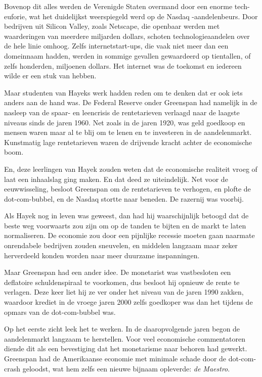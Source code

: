 \documentclass[
  a5paper,
  smalldemyvopaper,11pt,twoside,onecolumn,openright,extrafontsizes,
hidelinks]{memoir}
\begin{document}
Bovenop dit alles werden de Verenigde Staten overmand door een enorme
tech-euforie, wat het duidelijkst weerspiegeld werd op de Nasdaq
-aandelenbeurs. Door bedrijven uit Silicon Valley, zoals Netscape, die
openbaar werden met waarderingen van meerdere miljarden dollars, schoten
technologieaandelen over de hele linie omhoog. Zelfs internetstart-ups,
die vaak niet meer dan een domeinnaam hadden, werden in sommige gevallen
gewaardeerd op tientallen, of zelfs honderden, miljoenen dollars. Het
internet was de toekomst en iedereen wilde er een stuk van hebben.

Maar studenten van Hayeks werk hadden reden om te denken dat er ook iets
anders aan de hand was. De Federal Reserve onder Greenspan had namelijk
in de nasleep van de spaar- en leencrisis de rentetarieven verlaagd naar
de laagste niveaus sinds de jaren 1960. Net zoals in de jaren 1920, was
geld goedkoop en mensen waren maar al te blij om te lenen en te
investeren in de aandelenmarkt. Kunstmatig lage rentetarieven waren de
drijvende kracht achter de economische boom.

En, deze leerlingen van Hayek zouden weten dat de economische realiteit
vroeg of laat een inhaalslag ging maken. En dat deed ze uiteindelijk.
Net voor de eeuwwisseling, besloot Greenspan om de rentetarieven te
verhogen, en plofte de dot-com-bubbel, en de Nasdaq stortte naar
beneden. De razernij was voorbij.

Als Hayek nog in leven was geweest, dan had hij waarschijnlijk betoogd
dat de beste weg voorwaarts zou zijn om op de tanden te bijten en de
markt te laten normaliseren. De economie zou door een pijnlijke recessie
moeten gaan naarmate onrendabele bedrijven zouden sneuvelen, en middelen
langzaam maar zeker herverdeeld konden worden naar meer duurzame
inspanningen.

Maar Greenspan had een ander idee. De monetarist was vastbesloten een
deflatoire schuldenspiraal te voorkomen, dus besloot hij opnieuw de
rente te verlagen. Deze keer liet hij ze ver onder het niveau van de
jaren 1990 zakken, waardoor krediet in de vroege jaren 2000 zelfs
goedkoper was dan het tijdens de opmars van de dot-com-bubbel was.

Op het eerste zicht leek het te werken. In de daaropvolgende jaren begon
de aandelenmarkt langzaam te herstellen. Voor veel economische
commentatoren diende dit als een bevestiging dat het monetarisme naar
behoren had gewerkt. Greenspan had de Amerikaanse economie met minimale
schade door de dot-com-crash geloodst, wat hem zelfs een nieuwe bijnaam
opleverde: \emph{de Maestro}.
\end{document}

